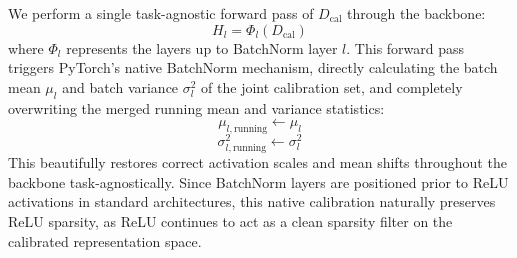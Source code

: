 \documentclass{article}
\theoremstyle{plain}
\theoremstyle{definition}
\theoremstyle{remark}
\begin{document}
We perform a single task-agnostic forward pass of $D_{\text{cal}}$ through the backbone:
\begin{equation}
    H_l = \Phi_l(D_{\text{cal}})
\end{equation}
where $\Phi_l$ represents the layers up to BatchNorm layer $l$. This forward pass triggers PyTorch's native BatchNorm mechanism, directly calculating the batch mean $\mu_l$ and batch variance $\sigma_l^2$ of the joint calibration set, and completely overwriting the merged running mean and variance statistics:
\begin{equation}
    \mu_{l,\text{running}} \leftarrow \mu_{l}
\end{equation}
\begin{equation}
    \sigma^2_{l,\text{running}} \leftarrow \sigma^2_l
\end{equation}
This beautifully restores correct activation scales and mean shifts throughout the backbone task-agnostically. Since BatchNorm layers are positioned prior to ReLU activations in standard architectures, this native calibration naturally preserves ReLU sparsity, as ReLU continues to act as a clean sparsity filter on the calibrated representation space.
\end{document}
